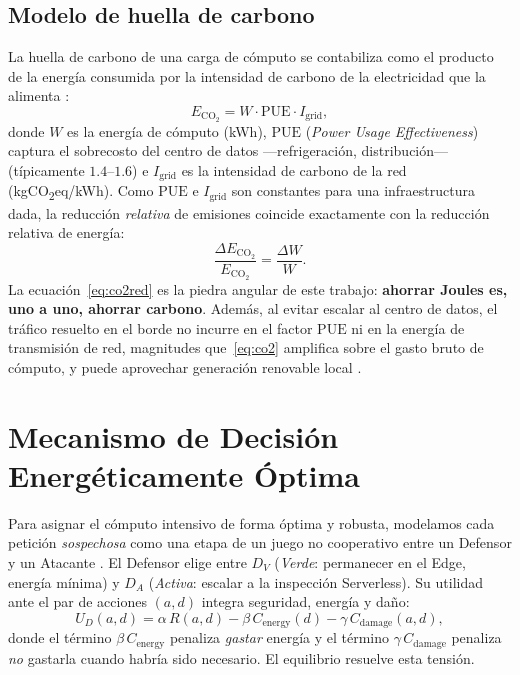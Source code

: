 \documentclass[10pt,twocolumn]{article}
\begin{document}
\subsection{Modelo de huella de carbono}
La huella de carbono de una carga de c\'omputo se contabiliza como el producto de la
energ\'ia consumida por la intensidad de carbono de la electricidad que la alimenta
\cite{masanet,radu}:
\begin{equation}
\label{eq:co2}
E_{\mathrm{CO_2}} = W \cdot \mathrm{PUE} \cdot I_{\mathrm{grid}},
\end{equation}
donde $W$ es la energ\'ia de c\'omputo (kWh), $\mathrm{PUE}$ (\emph{Power Usage
Effectiveness}) captura el sobrecosto del centro de datos ---refrigeraci\'on,
distribuci\'on--- (t\'ipicamente $1.4$--$1.6$) e $I_{\mathrm{grid}}$ es la intensidad
de carbono de la red (kgCO\textsubscript{2}eq/kWh). Como $\mathrm{PUE}$ e
$I_{\mathrm{grid}}$ son constantes para una infraestructura dada, la reducci\'on
\emph{relativa} de emisiones coincide exactamente con la reducci\'on relativa de
energ\'ia:
\begin{equation}
\label{eq:co2red}
\frac{\Delta E_{\mathrm{CO_2}}}{E_{\mathrm{CO_2}}} = \frac{\Delta W}{W}.
\end{equation}
La ecuaci\'on~\eqref{eq:co2red} es la piedra angular de este trabajo: \textbf{ahorrar
Joules es, uno a uno, ahorrar carbono}. Adem\'as, al evitar escalar al centro de
datos, el tr\'afico resuelto en el borde no incurre en el factor $\mathrm{PUE}$ ni en
la energ\'ia de transmisi\'on de red, magnitudes que~\eqref{eq:co2} amplifica sobre el
gasto bruto de c\'omputo, y puede aprovechar generaci\'on renovable local
\cite{radu}.

\section{Mecanismo de Decisi\'on Energ\'eticamente \'Optima}
\label{sec:math}
Para asignar el c\'omputo intensivo de forma \'optima y robusta, modelamos cada
petici\'on \emph{sospechosa} como una etapa de un juego no cooperativo entre un
Defensor y un Atacante \cite{alpcan}. El Defensor elige entre $D_V$ (\emph{Verde}:
permanecer en el Edge, energ\'ia m\'inima) y $D_A$ (\emph{Activa}: escalar a la
inspecci\'on Serverless). Su utilidad ante el par de acciones $(a,d)$ integra
seguridad, energ\'ia y da\~no:
\begin{equation}
\label{eq:util}
U_D(a,d) = \alpha\, R(a,d) - \beta\, C_{\text{energy}}(d) - \gamma\, C_{\text{damage}}(a,d),
\end{equation}
donde el t\'ermino $\beta\,C_{\text{energy}}$ penaliza \emph{gastar} energ\'ia y el
t\'ermino $\gamma\,C_{\text{damage}}$ penaliza \emph{no} gastarla cuando habr\'ia sido
necesario. El equilibrio resuelve esta tensi\'on.
\end{document}
